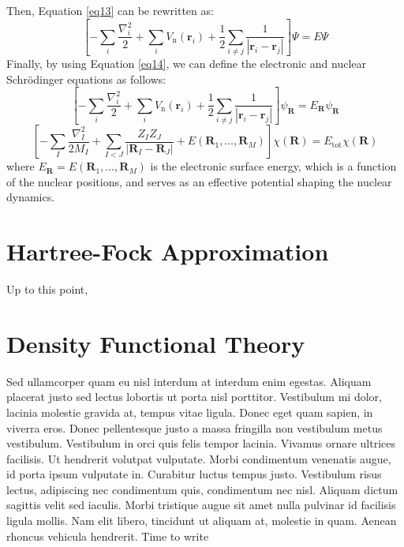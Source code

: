 Then, Equation \ref{eq13} can be rewritten as:
\begin{equation}
  \label{eq17}
  \left[
    -\sum_i \frac{\nabla_i^2}{2} + \sum_i V_{\text{n}}(\mathbf{r}_i) + \frac{1}{2} \sum_{i\neq j} \frac{1}{|\mathbf{r}_i - \mathbf{r}_j|} 
  \right] \Psi = E \Psi 
\end{equation}
Finally, by using Equation \ref{eq14}, we can define the electronic and nuclear Schrödinger equations as follows:
\begin{equation}
  \label{eq18}
  \left[
    -\sum_i \frac{\nabla_i^2}{2} + \sum_i V_{\text{n}}(\mathbf{r}_i) + \frac{1}{2} \sum_{i\neq j} \frac{1}{|\mathbf{r}_i - \mathbf{r}_j|} 
  \right] \psi_{\mathbf{R}} = E_{\mathbf{R}} \psi_{\mathbf{R}}
\end{equation}
\begin{equation}
  \label{eq19}
  \left[
    -\sum_I \frac{\nabla_I^2}{2 M_I} + \sum_{I<J} \frac{Z_I Z_J}{|\mathbf{R}_I - \mathbf{R}_J|} + E(\mathbf{R}_1,\dots,\mathbf{R}_M)\right] \chi(\mathbf{R}) = E_{\text{tot}} \chi(\mathbf{R})
\end{equation}
where $E_{\mathbf{R}}= E(\mathbf{R}_1,\dots,\mathbf{R}_M)$ is the electronic surface energy, which is a function of the nuclear positions, and serves as an effective potential shaping the nuclear dynamics. 


\section{Hartree-Fock Approximation}
Up to this point, 


\section{Density Functional Theory}

Sed ullamcorper quam eu nisl interdum at interdum enim egestas. Aliquam placerat justo sed lectus lobortis ut porta nisl porttitor. Vestibulum mi dolor, lacinia molestie gravida at, tempus vitae ligula. Donec eget quam sapien, in viverra eros. Donec pellentesque justo a massa fringilla non vestibulum metus vestibulum. Vestibulum in orci quis felis tempor lacinia. Vivamus ornare ultrices facilisis. Ut hendrerit volutpat vulputate. Morbi condimentum venenatis augue, id porta ipsum vulputate in. Curabitur luctus tempus justo. Vestibulum risus lectus, adipiscing nec condimentum quis, condimentum nec nisl. Aliquam dictum sagittis velit sed iaculis. Morbi tristique augue sit amet nulla pulvinar id facilisis ligula mollis. Nam elit libero, tincidunt ut aliquam at, molestie in quam. Aenean rhoncus vehicula hendrerit. Time to write 


